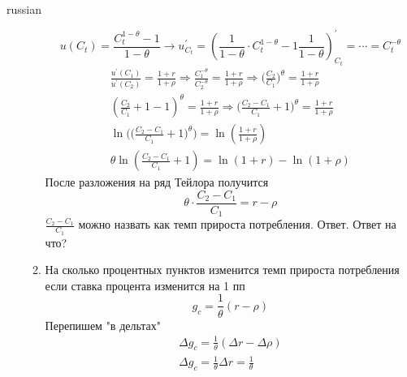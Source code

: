 \documentclass{article}
\begin{document}
\begin{otherlanguage*}{russian}
\begin{enumerate}
\begin{enumerate}
\begin{equation}
u(C_t)  = \frac{C^{1 - \theta}_t - 1}{1 - \theta} \rightarrow u^{'}_{C_t} =( \frac{1}{1 - \theta} \cdot C^{1 - \theta}_t - 1 \frac{1}{1 - \theta})^{'}_{C_t} = \cdots = C_t^{- \theta} 
\end{equation}
\begin{align}
\frac{u^{'}(C_1)}{u^{'}(C_2)} = \frac{1 + r}{1 + \rho} \Rightarrow \frac{C_1^{-\theta}}{C_2^{-\theta}} = \frac{1 + r}{1 + \rho} \Rightarrow \Big( \frac{C_2}{C_1}\Big)^\theta = \frac{1 + r}{1 + \rho} \\
(\frac{C_2}{C_1} + 1 - 1)^\theta = \frac{1 + r}{1 + \rho} \Rightarrow \Big( \frac{C_2 - C_1}{C_1} + 1 \Big)^\theta = \frac{1 + r}{1 + \rho} \\
\ln \Big(\Big( \frac{C_2 - C_1}{C_1} + 1 \Big)^\theta \Big)= \ln (\frac{1 + r}{1 + \rho}) \\
\theta \ln (\frac{C_2 - C_1}{C_1} + 1) = \ln ( 1+ r) - \ln (1 + \rho) 
\end{align}
После разложения на ряд Тейлора получится 
\begin{equation}
\theta \cdot \frac{C_2 - C_1}{C_1} = r - \rho 
\end{equation}
$ \frac{C_2 - C_1}{C_1} $ можно назвать как темп прироста потребления. Ответ. Ответ на что? 
\item На сколько процентных пунктов изменится темп прироста потребления если ставка процента изменится на 1 пп 
\begin{equation}
g_c = \frac{1}{\theta} (r - \rho ) 
\end{equation}
Перепишем "в дельтах"
\begin{align}
\Delta g_c = \frac{1}{\theta} ( \Delta r - \Delta \rho) \\
\Delta g_c = \frac{1}{\theta} \Delta r = \frac{1}{\theta}
\end{align}
\end{enumerate}
\end{enumerate}
\end{otherlanguage*} 
\end{document}
